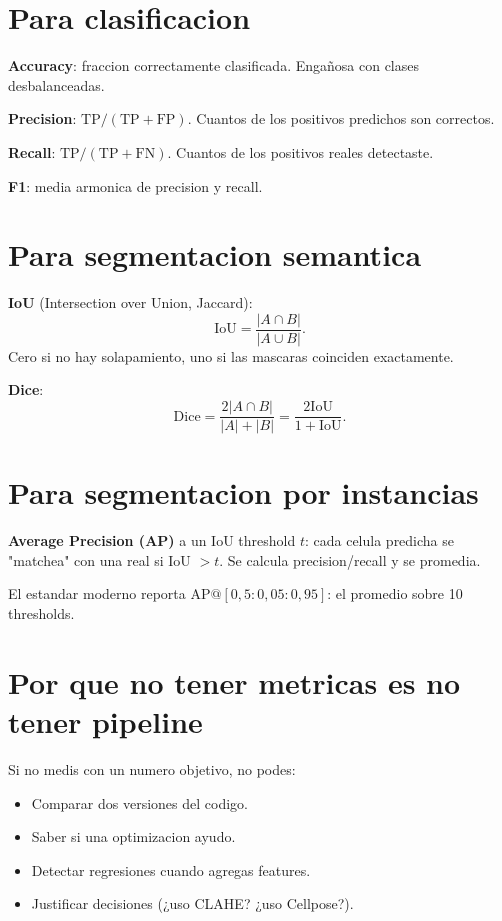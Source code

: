\documentclass[11pt,a4paper,twoside,openright]{book}
\begin{document}
\section{Para clasificacion}

\textbf{Accuracy}: fraccion correctamente clasificada. Engañosa con clases desbalanceadas.

\textbf{Precision}: $\mathrm{TP}/(\mathrm{TP}+\mathrm{FP})$. Cuantos de los positivos predichos son correctos.

\textbf{Recall}: $\mathrm{TP}/(\mathrm{TP}+\mathrm{FN})$. Cuantos de los positivos reales detectaste.

\textbf{F1}: media armonica de precision y recall.

\section{Para segmentacion semantica}

\textbf{IoU} (Intersection over Union, Jaccard):
\begin{equation}
\mathrm{IoU} = \frac{|A \cap B|}{|A \cup B|}.
\end{equation}
Cero si no hay solapamiento, uno si las mascaras coinciden exactamente.

\textbf{Dice}:
\begin{equation}
\mathrm{Dice} = \frac{2|A \cap B|}{|A| + |B|} = \frac{2 \mathrm{IoU}}{1 + \mathrm{IoU}}.
\end{equation}

\section{Para segmentacion por instancias}

\textbf{Average Precision (AP)} a un IoU threshold $t$: cada celula predicha se "matchea" con una real si IoU $> t$. Se calcula precision/recall y se promedia.

El estandar moderno reporta $\mathrm{AP@}[0{,}5{:}0{,}05{:}0{,}95]$: el promedio sobre 10 thresholds.

\section{Por que no tener metricas es no tener pipeline}

Si no medis con un numero objetivo, no podes:
\begin{itemize}[leftmargin=2em]
  \item Comparar dos versiones del codigo.
  \item Saber si una optimizacion ayudo.
  \item Detectar regresiones cuando agregas features.
  \item Justificar decisiones (¿uso CLAHE? ¿uso Cellpose?).
\end{itemize}
\end{document}
